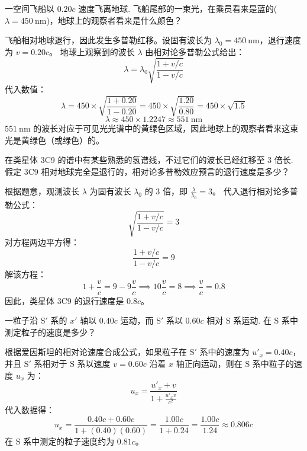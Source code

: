 \begin{exercise}\label{ex:9.8}
一空间飞船以 $0.20c$ 速度飞离地球. 飞船尾部的一束光，在乘员看来是蓝的($\lambda = 450 \ \mathrm{nm}$)，地球上的观察者看来是什么颜色？
\end{exercise}
\begin{solution}
飞船相对地球退行，因此发生多普勒红移。设固有波长为 $\lambda_0 = 450 \ \mathrm{nm}$，退行速度为 $v = 0.20c$。
地球上观察到的波长 $\lambda$ 由相对论多普勒公式给出：
$$ \lambda = \lambda_0 \sqrt{\frac{1 + v/c}{1 - v/c}} $$
代入数值：
$$ \lambda = 450 \times \sqrt{\frac{1 + 0.20}{1 - 0.20}} = 450 \times \sqrt{\frac{1.20}{0.80}} = 450 \times \sqrt{1.5} $$
$$ \lambda \approx 450 \times 1.2247 \approx 551 \ \mathrm{nm} $$
$551 \ \mathrm{nm}$ 的波长对应于可见光光谱中的黄绿色区域，因此地球上的观察者看来这束光是黄绿色（或绿色）的。
\end{solution}

\begin{exercise}\label{ex:9.9}
在类星体 3C9 的谱中有某些熟悉的氢谱线，不过它们的波长已经红移至 3 倍长. 假定 3C9 相对地球完全是退行的，相对论多普勒效应预言的退行速度是多少？
\end{exercise}
\begin{solution}
根据题意，观测波长 $\lambda$ 为固有波长 $\lambda_0$ 的 3 倍，即 $\frac{\lambda}{\lambda_0} = 3$。
代入退行相对论多普勒公式：
$$ \sqrt{\frac{1 + v/c}{1 - v/c}} = 3 $$
对方程两边平方得：
$$ \frac{1 + v/c}{1 - v/c} = 9 $$
解该方程：
$$ 1 + \frac{v}{c} = 9 - 9\frac{v}{c} \implies 10 \frac{v}{c} = 8 \implies \frac{v}{c} = 0.8 $$
因此，类星体 3C9 的退行速度是 $0.8c$。
\end{solution}

\begin{exercise}\label{ex:9.10}
一粒子沿 S$'$ 系的 $x'$ 轴以 $0.40c$ 运动，而 S$'$ 系以 $0.60c$ 相对 S 系运动. 在 S 系中测定粒子的速度是多少？
\end{exercise}
\begin{solution}
根据爱因斯坦的相对论速度合成公式，如果粒子在 $\mathrm{S}'$ 系中的速度为 $u'_x = 0.40c$，并且 $\mathrm{S}'$ 系相对于 $\mathrm{S}$ 系以速度 $v = 0.60c$ 沿着 $x$ 轴正向运动，则在 $\mathrm{S}$ 系中粒子的速度 $u_x$ 为：
$$ u_x = \frac{u'_x + v}{1 + \frac{u'_x v}{c^2}} $$
代入数据得：
$$ u_x = \frac{0.40c + 0.60c}{1 + (0.40)(0.60)} = \frac{1.00c}{1 + 0.24} = \frac{1.00c}{1.24} \approx 0.806c $$
在 $\mathrm{S}$ 系中测定的粒子速度约为 $0.81c$。
\end{solution}

